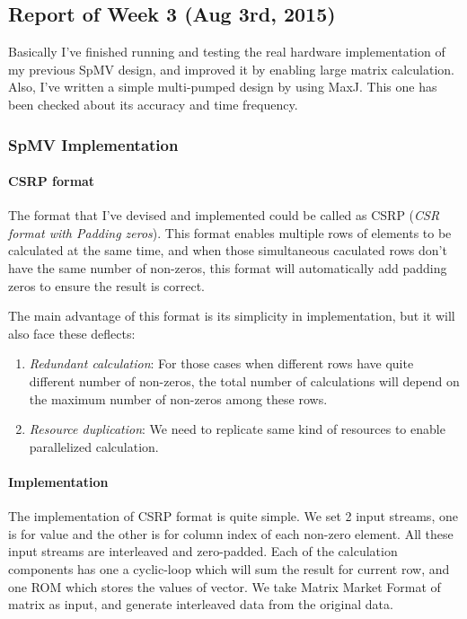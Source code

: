 \subsection{Report of Week 3 (Aug 3rd, 2015)}

Basically I've finished running and testing the real hardware implementation of my previous SpMV design, and improved it by enabling large matrix calculation. Also, I've written a simple multi-pumped design by using MaxJ. This one has been checked about its accuracy and time frequency. 

\subsubsection{SpMV Implementation}

\paragraph{CSRP format} The format that I've devised and implemented could be called as CSRP (\textit{CSR format with Padding zeros}). This format enables multiple rows of elements to be calculated at the same time, and when those simultaneous caculated rows don't have the same number of non-zeros, this format will automatically add padding zeros to ensure the result is correct. 

The main advantage of this format is its simplicity in implementation, but it will also face these deflects:
\begin{enumerate}
\item \textit{Redundant calculation}: For those cases when different rows have quite different number of non-zeros, the total number of calculations will depend on the maximum number of non-zeros among these rows. 
\item \textit{Resource duplication}: We need to replicate same kind of resources to enable parallelized calculation. 
\end{enumerate}

\paragraph{Implementation} The implementation of CSRP format is quite simple. We set 2 input streams, one is for value and the other is for column index of each non-zero element. All these input streams are interleaved and zero-padded. Each of the calculation components has one a cyclic-loop which will sum the result for current row, and one ROM which stores the values of vector. We take Matrix Market Format of matrix as input, and generate interleaved data from the original data. 

